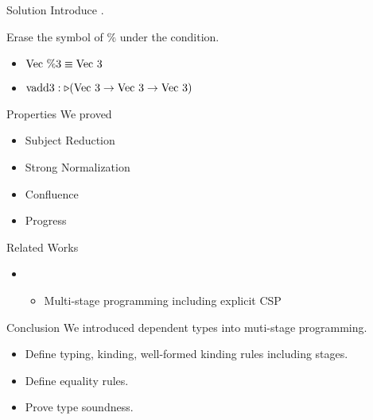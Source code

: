 \documentclass[dvipdfmx,aspectratio=169, 20pt]{beamer}
\begin{document}
\begin{frame}[fragile]{Solution}
    \newcommand{\Vt}{\text{Vec}\ 3}
    Introduce \QPercent.
    \begin{center}
    \end{center}
    Erase the symbol of \( \% \) under the condition.
    \begin{itemize}
        \item \( \text{Vec}\ \%3 \equiv \text{Vec}\ 3 \)
        \item \( \text{vadd3} : \TW (\Vt \to \Vt \to \Vt) \)
    \end{itemize}
\end{frame}

\begin{frame}[fragile]{Properties}
    We proved
    \begin{itemize}
        \item Subject Reduction
        \item Strong Normalization
        \item Confluence
        \item Progress
    \end{itemize}
    \note{
    }
\end{frame}

\begin{frame}[fragile]{Related Works}
    \begin{itemize}
        \item {}
            \begin{itemize}
                \item Multi-stage programming including explicit CSP
            \end{itemize}
    \end{itemize}
    \note{
    }
\end{frame}

\begin{frame}[fragile]{Conclusion}
        We introduced dependent types into muti-stage programming.
        \begin{itemize}
            \item Define typing, kinding, well-formed kinding rules including stages.
            \item Define equality rules.
            \item Prove type soundness.
        \end{itemize}
    \note{
    }
\end{frame}
\end{document}
